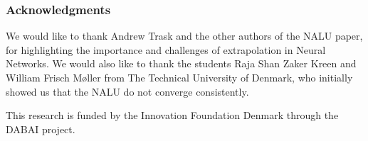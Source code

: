 \documentclass{article}
\begin{document}
\begin{abstract}
\end{abstract}







\clearpage
\ifdefined\nonanonymous
\subsubsection*{Acknowledgments}
We would like to thank Andrew Trask and the other authors of the NALU paper, for highlighting the importance and challenges of extrapolation in Neural Networks. We would also like to thank the students Raja Shan Zaker Kreen and William Frisch Møller from The Technical University of Denmark, who initially showed us that the NALU do not converge consistently. 

This research is funded by the Innovation Foundation Denmark through the DABAI project.
\fi




\newpage
\appendix

\clearpage

\clearpage

\clearpage

\clearpage
%
\end{document}

